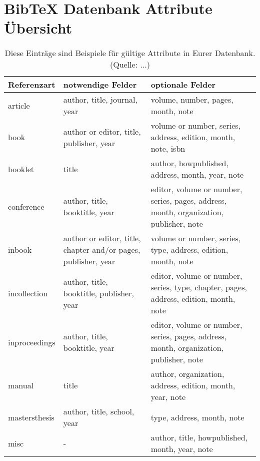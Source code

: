 




\chapter{BibTeX Datenbank Attribute Übersicht}
\label{chap: BibTeX-DB}

\begin{table}[!h]
\caption[\bibtex Attribute Übersicht]{Diese Einträge sind Beispiele für gültige Attribute in Eurer \bibtex Datenbank. (Quelle: ...)}
\label{tab:bibtexentries} 	%
\centering
\begin{footnotesize}
\begin{tabular}{p{}p{}p{}}
\textbf{Referenzart}   &   \textbf{notwendige Felder}   &   \textbf{optionale Felder}  \\  \hline
article   &   author, title, journal, year   &   volume, number, pages, month, note  \\  \hline
book   &   author or editor, title, publisher, year   &   volume or number, series, address, edition, month, note, isbn  \\  \hline
booklet   &   title   &   author, howpublished, address, month, year, note  \\  \hline
conference   &   author, title, booktitle, year   &   editor, volume or number, series, pages, address, month, organization, publisher, note  \\  \hline
inbook   &   author or editor, title, chapter and/or pages, publisher, year   &   volume or number, series, type, address, edition, month, note  \\  \hline
incollection   &   author, title, booktitle, publisher, year   &   editor, volume or number, series, type, chapter, pages, address, edition, month, note  \\  \hline
inproceedings   &   author, title, booktitle, year   &   editor, volume or number, series, pages, address, month, organization, publisher, note  \\  \hline
manual   &   title   &   author, organization, address, edition, month, year, note  \\  \hline
mastersthesis   &   author, title, school, year   &   type, address, month, note  \\  \hline
misc   &   -   &   author, title, howpublished, month, year, note  \\  \hline

\end{tabular}
\end{footnotesize}
\end{table}
